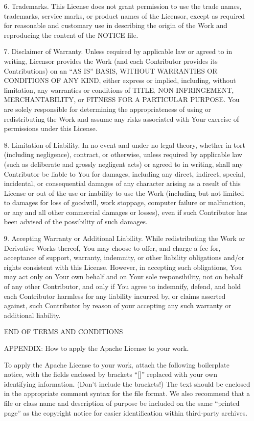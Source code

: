 \documentclass[]{article}
\begin{document}
6. Trademarks. This License does not grant permission to use the trade
names, trademarks, service marks, or product names of the Licensor,
except as required for reasonable and customary use in describing the
origin of the Work and reproducing the content of the NOTICE file.

7. Disclaimer of Warranty. Unless required by applicable law or agreed
to in writing, Licensor provides the Work (and each Contributor provides
its Contributions) on an ``AS IS'' BASIS, WITHOUT WARRANTIES OR
CONDITIONS OF ANY KIND, either express or implied, including, without
limitation, any warranties or conditions of TITLE, NON-INFRINGEMENT,
MERCHANTABILITY, or FITNESS FOR A PARTICULAR PURPOSE. You are solely
responsible for determining the appropriateness of using or
redistributing the Work and assume any risks associated with Your
exercise of permissions under this License.

8. Limitation of Liability. In no event and under no legal theory,
whether in tort (including negligence), contract, or otherwise, unless
required by applicable law (such as deliberate and grossly negligent
acts) or agreed to in writing, shall any Contributor be liable to You
for damages, including any direct, indirect, special, incidental, or
consequential damages of any character arising as a result of this
License or out of the use or inability to use the Work (including but
not limited to damages for loss of goodwill, work stoppage, computer
failure or malfunction, or any and all other commercial damages or
losses), even if such Contributor has been advised of the possibility of
such damages.

9. Accepting Warranty or Additional Liability. While redistributing the
Work or Derivative Works thereof, You may choose to offer, and charge a
fee for, acceptance of support, warranty, indemnity, or other liability
obligations and/or rights consistent with this License. However, in
accepting such obligations, You may act only on Your own behalf and on
Your sole responsibility, not on behalf of any other Contributor, and
only if You agree to indemnify, defend, and hold each Contributor
harmless for any liability incurred by, or claims asserted against, such
Contributor by reason of your accepting any such warranty or additional
liability.

END OF TERMS AND CONDITIONS

APPENDIX: How to apply the Apache License to your work.

To apply the Apache License to your work, attach the following
boilerplate notice, with the fields enclosed by brackets ``{[}{]}''
replaced with your own identifying information. (Don't include the
brackets!) The text should be enclosed in the appropriate comment syntax
for the file format. We also recommend that a file or class name and
description of purpose be included on the same ``printed page'' as the
copyright notice for easier identification within third-party archives.
\end{document}
